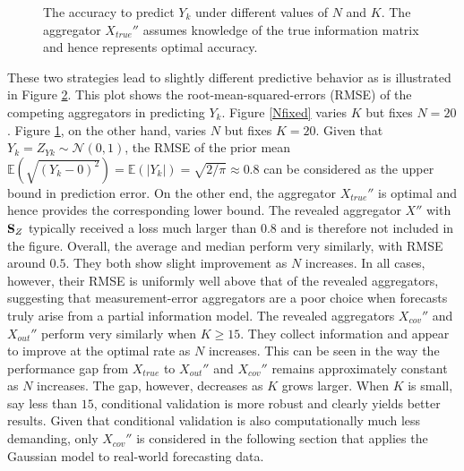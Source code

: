 \documentclass[11pt]{article}
\newcommand{\E}{\mathbb{E}}
\theoremstyle{definition}
\theoremstyle{definition}
\def\SS{{\bf S}}
\def\E{{\mathbb E}}
\begin{document}
\begin{figure}[t!]
\begin{subfigure}{0.5\textwidth}
                                \label{Kfixed}
        \end{subfigure}
         \caption{The accuracy to predict $Y_k$ under different values of $N$ and $K$. The aggregator $X_{true}''$ assumes knowledge of the true information matrix and hence represents optimal accuracy.}
        \label{XEstimation}
\end{figure}




These two strategies lead to slightly different predictive behavior as is illustrated in Figure \ref{XEstimation}. This plot shows the root-mean-squared-errors (RMSE) of the competing aggregators in predicting $Y_k$. Figure \ref{Nfixed} varies $K$ but fixes $N = 20$.  Figure \ref{Kfixed}, on the other hand,  varies $N$ but fixes $K = 20$. Given that $Y_k = Z_{Yk} \sim \mathcal{N}(0,1)$, the RMSE of the prior mean $\E(\sqrt{(Y_k-0)^2}) = \E(|Y_k|) = \sqrt{2/\pi} \approx 0.8$ can be considered as the upper bound in prediction error. On the other end, the aggregator $X_{true}''$ is optimal and hence provides the corresponding lower bound. The revealed aggregator $X''$ with $\SS_Z$ typically received a loss much larger than $0.8$ and is therefore not included in the figure. Overall, the average and median perform very similarly, with RMSE around $0.5$. They both show slight improvement as $N$ increases. In all cases, however, their RMSE is uniformly well above that of the revealed aggregators, suggesting that measurement-error aggregators are a poor choice when forecasts truly arise from a partial information model. The revealed aggregators $X_{cov}''$ and $X_{out}''$ perform very similarly when $K \geq 15$. They collect information and appear to improve at the optimal rate as $N$ increases. This can be seen in the way the performance gap from $X_{true}$ to  $X_{out}''$ and $X_{cov}''$ remains approximately constant as $N$ increases. The gap, however, decreases as $K$ grows larger.  When $K$ is small, say less than $15$, conditional validation is more robust and clearly yields better results. Given that conditional validation is also computationally much less demanding, only $X_{cov}''$ is considered in the following section that applies the Gaussian model to real-world forecasting data. 
  
\end{document}
